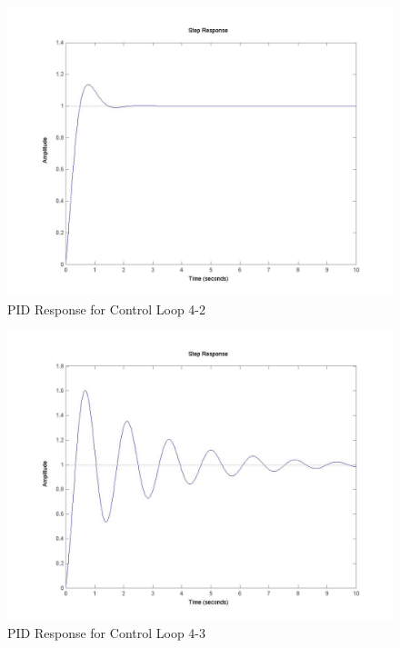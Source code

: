 	\begin{figure}[H]
		\includegraphics[width=\textwidth]{part4-2.jpg}
		\caption{PID Response for Control Loop 4-2}
	\end{figure}
	
	\begin{figure}[H]
		\includegraphics[width=\textwidth]{part4-3.jpg}
		\caption{PID Response for Control Loop 4-3}
	\end{figure}
	
